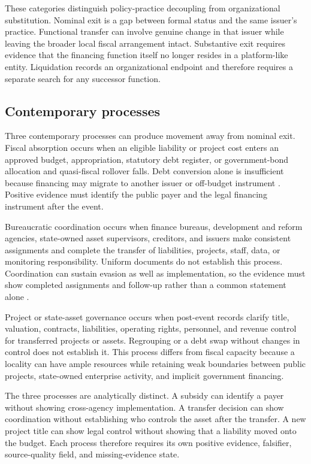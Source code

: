 These categories distinguish policy-practice decoupling from organizational
substitution. Nominal exit is a gap between formal status and the same issuer's
practice. Functional transfer can involve genuine change in that issuer while
leaving the broader local fiscal arrangement intact. Substantive exit requires
evidence that the financing function itself no longer resides in a platform-like
entity. Liquidation records an organizational endpoint and therefore requires a
separate search for any successor function.

\subsection{Contemporary processes}

Three contemporary processes can produce movement away from nominal exit.
Fiscal absorption occurs when an eligible liability or project cost enters an
approved budget, appropriation, statutory debt register, or government-bond
allocation and quasi-fiscal rollover falls. Debt conversion alone is
insufficient because financing may migrate to another issuer or off-budget
instrument \citep{wingender_2018_intergovernmental,
chen_he_liu_2020_financing}. Positive evidence must identify the public payer
and the legal financing instrument after the event.

Bureaucratic coordination occurs when finance bureaus, development and reform
agencies, state-owned asset supervisors, creditors, and issuers make consistent
assignments and complete the transfer of liabilities, projects, staff, data, or
monitoring responsibility. Uniform documents do not establish this process.
Coordination can sustain evasion as well as implementation, so the evidence must
show completed assignments and follow-up rather than a common statement alone
\citep{zhou_2010_collusion}.

Project or state-asset governance occurs when post-event records clarify title,
valuation, contracts, liabilities, operating rights, personnel, and revenue
control for transferred projects or assets. Regrouping or a debt swap without
changes in control does not establish it. This process differs from fiscal
capacity because a locality can have ample resources while retaining weak
boundaries between public projects, state-owned enterprise activity, and
implicit government financing.

The three processes are analytically distinct. A subsidy can identify a payer
without showing cross-agency implementation. A transfer decision can show
coordination without establishing who controls the asset after the transfer. A
new project title can show legal control without showing that a liability moved
onto the budget. Each process therefore requires its own positive evidence,
falsifier, source-quality field, and missing-evidence state.

